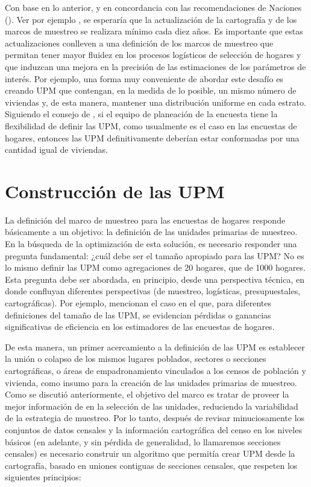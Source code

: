 \documentclass[
  12pt,
]{book}
\begin{document}
Con base en lo anterior, y en concordancia con las recomendaciones de Naciones (\citet{cepalcenso}). Ver por ejemplo , se esperaría que la actualización de la cartografía y de los marcos de muestreo se realizara mínimo cada diez años. Es importante que estas actualizaciones conlleven a una definición de los marcos de muestreo que permitan tener mayor fluidez en los procesos logísticos de selección de hogares y que induzcan una mejora en la precisión de las estimaciones de los parámetros de interés. Por ejemplo, una forma muy conveniente de abordar este desafío es creando UPM que contengan, en la medida de lo posible, un mismo número de viviendas y, de esta manera, mantener una distribución uniforme en cada estrato. Siguiendo el consejo de \citet[pág. 212]{Valliant_Dever_Kreuter_2013}, si el equipo de planeación de la encuesta tiene la flexibilidad de definir las UPM, como usualmente es el caso en las encuestas de hogares, entonces las UPM definitivamente deberían estar conformadas por una cantidad igual de viviendas.

\hypertarget{construcciuxf3n-de-las-upm}{%
\section{Construcción de las UPM}\label{construcciuxf3n-de-las-upm}}

La definición del marco de muestreo para las encuestas de hogares responde básicamente a un objetivo: la definición de las unidades primarias de muestreo. En la búsqueda de la optimización de esta solución, es necesario responder una pregunta fundamental: ¿cuál debe ser el tamaño apropiado para las UPM? No es lo mismo definir las UPM como agregaciones de 20 hogares, que de 1000 hogares. Esta pregunta debe ser abordada, en principio, desde una perspectiva técnica, en donde confluyan diferentes perspectivas (de muestreo, logísticas, presupuestales, cartográficas). Por ejemplo, \citet[Tabla 9.1]{Valliant_Dever_Kreuter_2013} mencionan el caso en el que, para diferentes definiciones del tamaño de las UPM, se evidencian pérdidas o ganancias significativas de eficiencia en los estimadores de las encuestas de hogares.

De esta manera, un primer acercamiento a la definición de las UPM es establecer la unión o colapso de los mismos lugares poblados, sectores o secciones cartográficas, o áreas de empadronamiento vinculados a los censos de población y vivienda, como insumo para la creación de las unidades primarias de muestreo. Como se discutió anteriormente, el objetivo del marco es tratar de proveer la mejor información de en la selección de las unidades, reduciendo la variabilidad de la estrategia de muestreo. Por lo tanto, después de revisar minuciosamente los conjuntos de datos censales y la información cartográfica del censo en los niveles básicos (en adelante, y sin pérdida de generalidad, lo llamaremos secciones censales) es necesario construir un algoritmo que permitía crear UPM desde la cartografía, basado en uniones contiguas de secciones censales, que respeten los siguientes principios:
\end{document}
